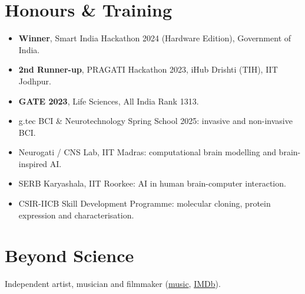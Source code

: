 \documentclass[10pt,a4paper]{article}
\begin{document}
\vspace{6pt}

\section{Honours \& Training}
\begin{itemize}
    \item \textbf{Winner}, Smart India Hackathon 2024 (Hardware Edition), Government of India.
    \item \textbf{2nd Runner-up}, PRAGATI Hackathon 2023, iHub Drishti (TIH), IIT Jodhpur.
    \item \textbf{GATE 2023}, Life Sciences, All India Rank 1313.
    \item g.tec BCI \& Neurotechnology Spring School 2025: invasive and non-invasive BCI.
    \item Neurogati / CNS Lab, IIT Madras: computational brain modelling and brain-inspired AI.
    \item SERB Karyashala, IIT Roorkee: AI in human brain-computer interaction.
    \item CSIR-IICB Skill Development Programme: molecular cloning, protein expression and characterisation.
\end{itemize}

\vspace{6pt}

\section{Beyond Science}
\small
Independent artist, musician and filmmaker (\href{https://open.spotify.com/artist/3VprLdYpRRnk0ymHHozFOb/}{music}, \href{https://www.imdb.com/name/nm14161356/}{IMDb}).
\end{document}
